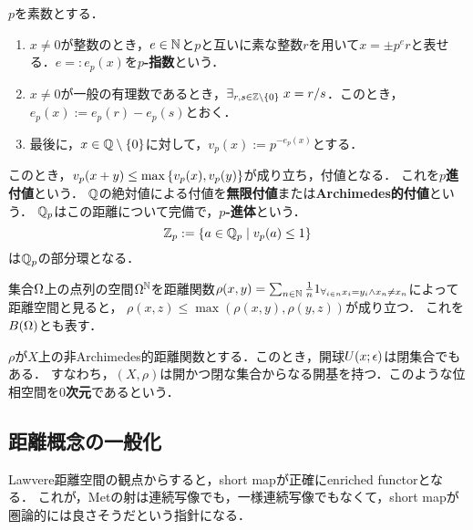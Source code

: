 \documentclass[uplatex,dvipdfmx]{jsreport}
\begin{document}
\begin{example}
    $p$を素数とする．
    \begin{enumerate}
        \item $x\ne0$が整数のとき，$e\in\mathbb{N}$と$p$と互いに素な整数$r$を用いて$x=\pm p^er$と表せる．$e=:e_p(x)$を\textbf{$p$-指数}という．
        \item $x\ne0$が一般の有理数であるとき，$\exists_{r,s\in\mathbb{Z}\setminus\{0\}}\;x=r/s$．このとき，$e_p(x):=e_p(r)-e_p(s)$とおく．
        \item 最後に，$x\in\mathbb{Q}\setminus\{0\}$に対して，$v_p(x):=p^{-e_p(x)}$とする．
    \end{enumerate}
    このとき，$v_p(x+y)\le\max\left\{v_p(x),v_p(y)\right\}$が成り立ち，付値となる．
    これを\textbf{$p$進付値}という．
    $\mathbb{Q}$の絶対値による付値を\textbf{無限付値}または\textbf{Archimedes的付値}という．
    $\mathbb{Q}_p$はこの距離について完備で，\textbf{$p$-進体}という．
    \[\mathbb{Z}_p:=\left\{a\in\mathbb{Q}_p\mid v_p(a)\le1\right\}\]
    は$\mathbb{Q}_p$の部分環となる．
\end{example}

\begin{theorem}[付値が定める距離空間]
    
\end{theorem}

\begin{example}[Baireの(0次元)空間]
    集合$\Omega$上の点列の空間$\Omega^{\mathbb{N}}$を距離関数$\rho(x,y)=\sum_{n\in\mathbb{N}}\frac{1}{n}1_{\forall_{i\in n}x_i=y_i\land x_n\ne x_n}$によって距離空間と見ると，
    $\rho(x,z)\le\max(\rho(x,y),\rho(y,z))$が成り立つ．
    これを$B(\Omega)$とも表す．
\end{example}

\begin{proposition}[非Archimedesな距離空間の開球は閉]
    $\rho$が$X$上の非Archimedes的距離関数とする．このとき，開球$U(x;\epsilon)$は閉集合でもある．
    すなわち，$(X,\rho)$は開かつ閉な集合からなる開基を持つ．このような位相空間を\textbf{$0$次元}であるという．
\end{proposition}

\subsection{距離概念の一般化}

\begin{tcolorbox}[colframe=ForestGreen, colback=ForestGreen!10!white,breakable,colbacktitle=ForestGreen!40!white,coltitle=black,fonttitle=\bfseries\sffamily,
    title=]
        Lawvere距離空間の観点からすると，short mapが正確にenriched functorとなる．
        これが，Metの射は連続写像でも，一様連続写像でもなくて，short mapが圏論的には良さそうだという指針になる．
\end{tcolorbox}
\end{document}
